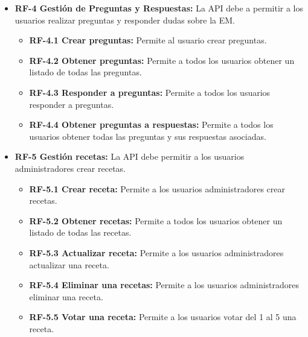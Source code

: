\begin{itemize}
\tightlist
\item
  \textbf{RF-4 Gestión de Preguntas y Respuestas:} La API debe a permitir a los usuarios realizar preguntas y responder dudas sobre la EM.\\
  \begin{itemize}
  \tightlist
  \item
    \textbf{RF-4.1 Crear preguntas:} Permite al usuario crear preguntas. \\
  \item
    \textbf{RF-4.2 Obtener preguntas:} Permite a todos los usuarios obtener un listado de todas las preguntas.\\
      \item
    \textbf{RF-4.3 Responder a preguntas:} Permite a todos los usuarios responder a preguntas.\\
          \item
    \textbf{RF-4.4 Obtener preguntas a respuestas:} Permite a todos los usuarios obtener todas las preguntas y sus respuestas asociadas.\\
    \end{itemize}    
\end{itemize}

\begin{itemize}
\tightlist
\item
  \textbf{RF-5 Gestión recetas:} La API debe permitir a los usuarios administradores crear recetas.\\
  \begin{itemize}
  \tightlist
  \item
    \textbf{RF-5.1 Crear receta:} Permite a los usuarios administradores crear recetas. \\
  \item
    \textbf{RF-5.2 Obtener recetas:} Permite a todos los usuarios obtener un listado de todas las recetas.\\
      \item
    \textbf{RF-5.3 Actualizar receta:} Permite a los usuarios administradores actualizar una receta.\\
          \item
    \textbf{RF-5.4 Eliminar una recetas:} Permite a los usuarios administradores eliminar una receta.\\
              \item
    \textbf{RF-5.5 Votar una receta:} Permite a los usuarios votar del 1 al 5 una receta.\\
\end{itemize}    
\end{itemize}


